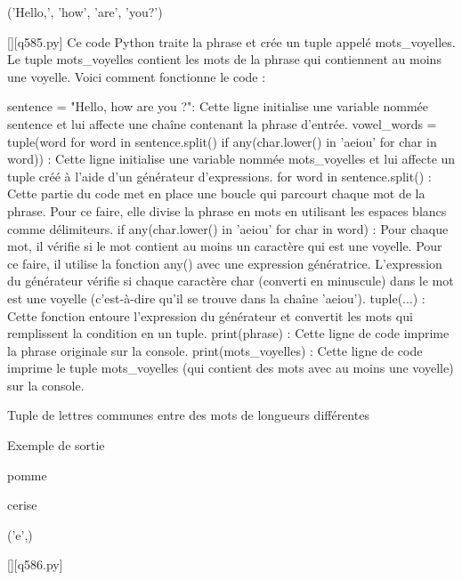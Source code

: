 ('Hello,', 'how', 'are', 'you?')
        \par
        \begin{solution}
            \renewcommand{\nomfichier}{q585.py}
            \pythonfile{\chemincode \nomfichier}[][\nomfichier]
            Ce code Python traite la phrase et crée un tuple appelé mots\_voyelles. Le tuple mots\_voyelles contient les mots de la phrase qui contiennent au moins une voyelle. Voici comment fonctionne le code :

    sentence = "Hello, how are you ?": Cette ligne initialise une variable nommée sentence et lui affecte une chaîne contenant la phrase d'entrée.
    vowel\_words = tuple(word for word in sentence.split() if any(char.lower() in 'aeiou' for char in word)) : Cette ligne initialise une variable nommée mots\_voyelles et lui affecte un tuple créé à l'aide d'un générateur d'expressions.
        for word in sentence.split() : Cette partie du code met en place une boucle qui parcourt chaque mot de la phrase. Pour ce faire, elle divise la phrase en mots en utilisant les espaces blancs comme délimiteurs.
        if any(char.lower() in 'aeiou' for char in word) : Pour chaque mot, il vérifie si le mot contient au moins un caractère qui est une voyelle. Pour ce faire, il utilise la fonction any() avec une expression génératrice. L'expression du générateur vérifie si chaque caractère char (converti en minuscule) dans le mot est une voyelle (c'est-à-dire qu'il se trouve dans la chaîne 'aeiou').
        tuple(...) : Cette fonction entoure l'expression du générateur et convertit les mots qui remplissent la condition en un tuple.
    print(phrase) : Cette ligne de code imprime la phrase originale sur la console.
    print(mots\_voyelles) : Cette ligne de code imprime le tuple mots\_voyelles (qui contient des mots avec au moins une voyelle) sur la console.
        \end{solution}
        

        \question
        Tuple de lettres communes entre des mots de longueurs différentes

Exemple de sortie

pomme

cerise

('e',)
        \par
        \begin{solution}
            \renewcommand{\nomfichier}{q586.py}
            \pythonfile{\chemincode \nomfichier}[][\nomfichier]
            
        \end{solution}
        

